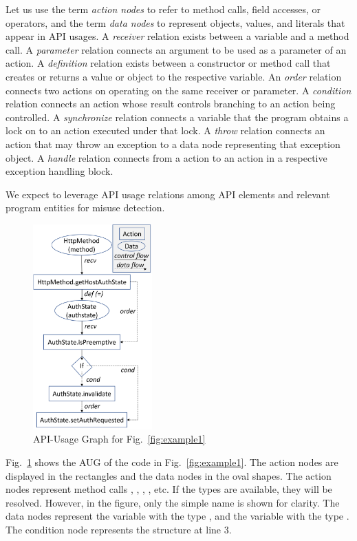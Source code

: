 Let us use the term {\em action nodes} to refer to method calls, field
accesses, or operators, and the term {\em data nodes} to represent
objects, values, and literals that appear in API usages. A {\em
  receiver} relation exists between a variable and a method call. A
{\em parameter} relation connects an argument to be used as a
parameter of an action. A {\em definition} relation exists between a
constructor or method call that creates or returns a value or object
to the respective variable. An {\em order} relation connects two
actions on operating on the same receiver or parameter. A {\em
  condition} relation connects an action whose result controls
branching to an action being controlled. A {\em synchronize} relation
connects a variable that the program obtains a lock on to an action
executed under that lock. A {\em throw} relation connects an action
that may throw an exception to a data node representing that exception
object. A {\em handle} relation connects from a  action to
an action in a respective exception handling block.

We expect to leverage API usage relations among API elements
and relevant program entities for misuse detection.

\begin{figure}[t] %
	\centering
	\includegraphics[width=1.8in]{aug}
        \vspace{-3pt}
	\caption{API-Usage Graph for Fig.~\ref{fig:example1}}
	\label{fig:aug}
\end{figure}

Fig.~\ref{fig:aug} shows the AUG of the code in
Fig.~\ref{fig:example1}.  The action nodes are displayed in the
rectangles and the data nodes in the oval shapes. The action nodes
represent method calls ,
, ,
, etc. If the types are available,
they will be resolved. However, in the figure, only the simple name is
shown for clarity. The data nodes represent the variable 
with the type , and the variable 
with the type . The condition node 
represents the  structure at line 3.

